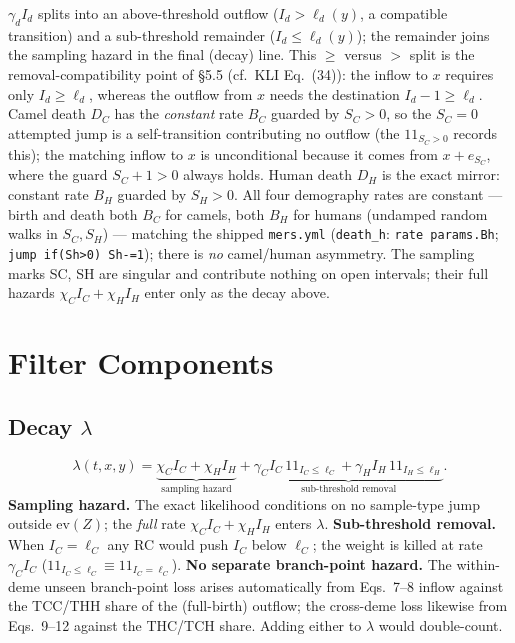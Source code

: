 \documentclass[11pt]{article}
\newcommand{\evZ}{\mathrm{ev}(Z)}
\newcommand{\ind}{1\!\!1}
\theoremstyle{plain}
\begin{document}
$\gamma_d I_d$ splits into an above-threshold outflow ($I_d>\ell_d(y)$, a compatible transition) and
a sub-threshold remainder ($I_d\le\ell_d(y)$); the remainder joins the sampling hazard in the final
(decay) line. This $\ge$ versus $>$ split is the removal-compatibility point of \S5.5 (cf.\ KLI
Eq.~(34)): the inflow to $x$ requires only $I_d\ge\ell_d$, whereas the outflow from $x$ needs the
destination $I_d-1\ge\ell_d$. Camel death $D_C$ has the \emph{constant} rate $B_C$ guarded by
$S_C>0$, so the $S_C=0$ attempted jump is a self-transition contributing no outflow (the
$\ind_{S_C>0}$ records this); the matching inflow to $x$ is unconditional because it comes from
$x{+}e_{S_C}$, where the guard $S_C{+}1>0$ always holds. Human death $D_H$ is the exact mirror:
constant rate $B_H$ guarded by $S_H>0$. All four demography rates are constant --- birth and death both
$B_C$ for camels, both $B_H$ for humans (undamped random walks in $S_C,S_H$) --- matching the shipped
\texttt{mers.yml} (\texttt{death\_h}: \texttt{rate params.Bh}; \texttt{jump if(Sh>0) Sh-=1}); there is
\emph{no} camel/human asymmetry. The sampling marks SC, SH are singular and contribute nothing on open intervals; their
full hazards $\chi_C I_C+\chi_H I_H$ enter only as the decay above.
\section{Filter Components}
\subsection{Decay $\lambda$}
\begin{equation}
\lambda(t,x,y)=\underbrace{\chi_C I_C+\chi_H I_H}_{\text{sampling hazard}}
+\underbrace{\gamma_C I_C\,\ind_{I_C\le\ell_C}+\gamma_H I_H\,\ind_{I_H\le\ell_H}}_{\text{sub-threshold removal}}.
\end{equation}
\textbf{Sampling hazard.} The exact likelihood conditions on no sample-type jump outside $\evZ$;
the \emph{full} rate $\chi_C I_C+\chi_H I_H$ enters $\lambda$. \textbf{Sub-threshold removal.} When
$I_C=\ell_C$ any RC would push $I_C$ below $\ell_C$; the weight is killed at rate $\gamma_C I_C$
($\ind_{I_C\le\ell_C}\equiv\ind_{I_C=\ell_C}$). \textbf{No separate branch-point hazard.} The
within-deme unseen branch-point loss arises automatically from Eqs.~7--8 inflow against the TCC/THH
share of the (full-birth) outflow; the cross-deme loss likewise from Eqs.~9--12 against the THC/TCH
share. Adding either to $\lambda$ would double-count.
\end{document}
